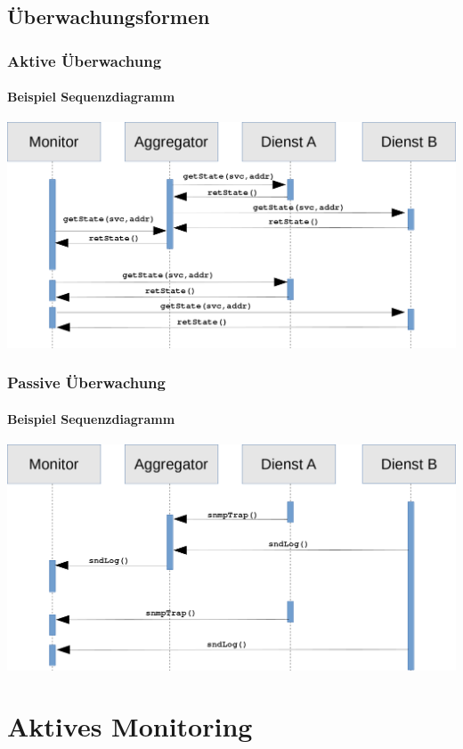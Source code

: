 \documentclass[10pt]{beamer} %
\begin{document}
\subsection{Überwachungsformen}
\begin{frame}
    \frametitle{Aktive Überwachung}
        \framesubtitle{Beispiel Sequenzdiagramm}
        
        \includegraphics[scale=0.25]{img/sequence_uml_active_trans.png}

\end{frame}


\begin{frame}
\frametitle{Passive Überwachung}
\framesubtitle{Beispiel Sequenzdiagramm}

\includegraphics[scale=0.25]{img/sequence_uml_passive_trans.png}

\end{frame}

\section{Aktives Monitoring}
\end{document}
